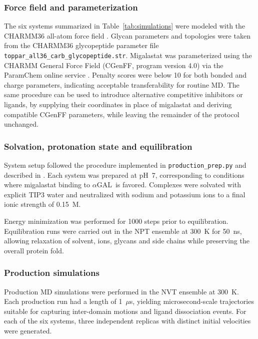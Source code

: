 \documentclass{article}
\newcommand{\agal}{$\alpha$GAL}
\begin{document}
\subsubsection{Force field and parameterization}

The six systems summarized in Table~\ref{tab:simulations} were modeled with the CHARMM36 all-atom force field \cite{charmm36}.
Glycan parameters and topologies were taken from the CHARMM36 glycopeptide parameter file \verb+toppar_all36_carb_glycopeptide.str+.
Migalastat was parameterized using the CHARMM General Force Field (CGenFF, program version 4.0) via the ParamChem online service \cite{vanommeslaeghe_automation_2012}.
Penalty scores were below 10 for both bonded and charge parameters, indicating acceptable transferability for routine MD.
The same procedure can be used to introduce alternative competitive inhibitors or ligands, by supplying their coordinates in place of migalastat and deriving compatible CGenFF parameters, while leaving the remainder of the protocol unchanged.

\subsubsection{Solvation, protonation state and equilibration}

System setup followed the procedure implemented in \verb+production_prep.py+ and described in \cite{proteinprepare}.
Each system was prepared at pH~7, corresponding to conditions where migalastat binding to \agal\ is favored.
Complexes were solvated with explicit TIP3 water and neutralized with sodium and potassium ions to a final ionic strength of 0.15~M.

Energy minimization was performed for 1000 steps prior to equilibration.
Equilibration runs were carried out in the NPT ensemble at 300~K for 50~ns, allowing relaxation of solvent, ions, glycans and side chains while preserving the overall protein fold.

\subsubsection{Production simulations}

Production MD simulations were performed in the NVT ensemble at 300~K.
Each production run had a length of 1~$\mu$s, yielding microsecond-scale trajectories suitable for capturing inter-domain motions and ligand dissociation events.
For each of the six systems, three independent replicas with distinct initial velocities were generated.
\end{document}
